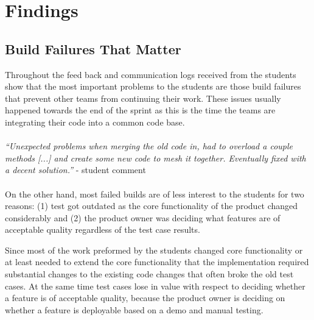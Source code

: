 \section{Findings}
\subsection{Build Failures That Matter}
Throughout the feed back and communication logs received from the students show that the most important problems to the students are those build failures that prevent other teams from continuing their work.
These issues usually happened towards the end of the sprint as this is the time the teams are integrating their code into a common code base.
\\ \ \\
\indent\emph{``Unexpected problems when merging the old code in, had to overload a couple methods [...]  and create some new code to mesh it together.  Eventually fixed with a decent solution.''} - student comment
\\ \ \\
\indent On the other hand, most failed builds are of less interest to the students for two reasons: 
(1) test got outdated as the core functionality of the product changed considerably 
and (2) the product owner was deciding what features are of acceptable quality regardless of the test case results.

Since most of the work preformed by the students changed core functionality or at least needed to extend the core functionality that the implementation required substantial changes to the existing code changes that often broke the old test cases.
At the same time test cases lose in value with respect to deciding whether a feature is of acceptable quality, because the product owner is deciding on whether a feature is deployable based on a demo and manual testing.

